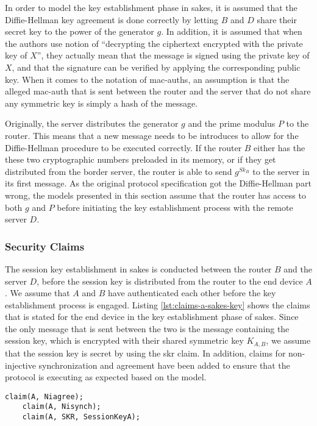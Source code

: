 In order to model the key establishment phase in \gls{sakes}, it is assumed that the Diffie-Hellman key agreement is done correctly by letting $B$ and $D$ share their secret key to the power of the generator $g$. In addition, it is assumed that when the authors use notion of ``decrypting the ciphertext encrypted with the private key of $X$'', they actually mean that the message is signed using the private key of $X$, and that the signature can be verified by applying the corresponding public key. When it comes to the notation of \gls{mac-auth}s, an assumption is that the alleged \gls{mac-auth} that is sent between the router and the server that do not share any symmetric key is simply a hash of the message.

Originally, the server distributes the generator $g$ and the prime modulus $P$ to the router. This means that a new message needs to be introduces to allow for the Diffie-Hellman procedure to be executed correctly. If the router $B$ either has the these two cryptographic numbers preloaded in its memory, or if they get distributed from the border server, the router is able to send $g^{Sk_B}$ to the server in its first message. As the original protocol specification got the Diffie-Hellman part wrong, the models presented in this section assume that the router has access to both $g$ and $P$ before initiating the key establishment process with the remote server $D$.


\subsubsection{Security Claims}

The session key establishment in \gls{sakes} is conducted between the router $B$ and the server $D$, before the session key is distributed from the router to the end device $A$. We assume that $A$ and $B$ have authenticated each other before the key establishment process is engaged. Listing \ref{lst:claims-a-sakes-key} shows the claims that is stated for the end device in the key establishment phase of \gls{sakes}. Since the only message that is sent between the two is the message containing the session key, which is encrypted with their shared symmetric key $K_{A,B}$, we assume that the session key is secret by using the \gls{skr} claim. In addition, claims for non-injective synchronization and agreement have been added to ensure that the protocol is executing as expected based on the model.\\

\begin{lstlisting}[caption={Security claims for role A during key establishment in SAKES.}, label={lst:claims-a-sakes-key}]
	claim(A, Niagree);
	claim(A, Nisynch);
	claim(A, SKR, SessionKeyA);
\end{lstlisting}

